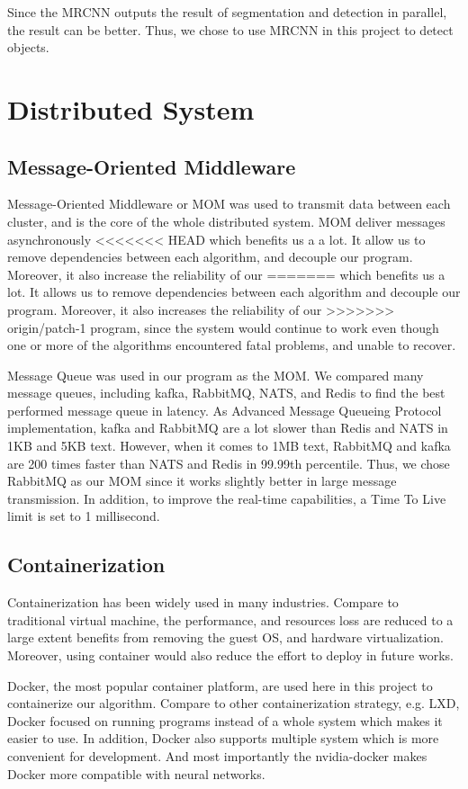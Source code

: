 \documentclass[runningheads]{llncs}
\begin{document}
Since the MRCNN outputs the result of segmentation and 
detection in parallel, the result can be better. Thus, 
we chose to use MRCNN in this project to detect objects.


\section{Distributed System}

\subsection{Message-Oriented Middleware}
Message-Oriented Middleware or MOM was used to transmit 
data between each cluster, and is the core of the whole 
distributed system. MOM deliver messages asynchronously 
<<<<<<< HEAD
which benefits us a a lot. It allow us to remove 
dependencies between each algorithm, and decouple our 
program. Moreover, it also increase the reliability of our 
=======
which benefits us a lot. It allows us to remove 
dependencies between each algorithm and decouple our 
program. Moreover, it also increases the reliability of our 
>>>>>>> origin/patch-1
program, since the system would continue to work even 
though one or more of the algorithms encountered fatal 
problems, and unable to recover.

Message Queue was used in our program as the MOM. We 
compared many message queues, including kafka, RabbitMQ, 
NATS, and Redis to find the best performed message queue 
in latency. As Advanced Message Queueing Protocol 
implementation, kafka and RabbitMQ are a lot slower than 
Redis and NATS in 1KB and 5KB text. However, when it comes
to 1MB text, RabbitMQ and kafka are 200 times faster than 
NATS and Redis in 99.99th percentile. Thus, we chose 
RabbitMQ as our MOM since it works slightly better in large 
message transmission. In addition, to improve the real-time 
capabilities, a Time To Live limit is set to 1 millisecond.


\subsection{Containerization}
Containerization has been widely used in many industries. 
Compare to traditional virtual machine, the performance, 
and resources loss are reduced to a large extent benefits 
from removing the guest OS, and hardware virtualization. 
Moreover, using container would also reduce the effort to 
deploy in future works. 

Docker, the most popular container platform, are used here 
in this project to containerize our algorithm. Compare to 
other containerization strategy, e.g. LXD, Docker focused 
on running programs instead of a whole system which makes 
it easier to use. In addition, Docker also supports multiple 
system which is more convenient for development. And most 
importantly the nvidia-docker makes Docker more compatible 
with neural networks.
\end{document}
